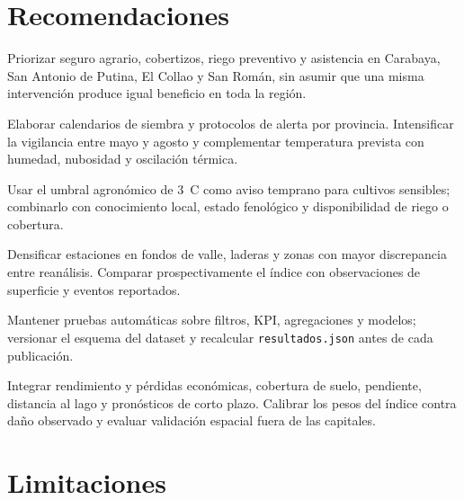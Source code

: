 \documentclass[11pt,a4paper]{article}
\begin{document}
\section{Recomendaciones}

\begin{description}[leftmargin=4.0cm,style=nextline,itemsep=0.65em]
  \item[Gobierno Regional de Puno.] Priorizar seguro agrario, cobertizos, riego preventivo
        y asistencia en Carabaya, San Antonio de Putina, El Collao y San Román, sin asumir
        que una misma intervención produce igual beneficio en toda la región.
  \item[Dirección Regional Agraria.] Elaborar calendarios de siembra y protocolos de
        alerta por provincia. Intensificar la vigilancia entre mayo y agosto y complementar
        temperatura prevista con humedad, nubosidad y oscilación térmica.
  \item[Productores y organizaciones.] Usar el umbral agronómico de 3~\textdegree C como
        aviso temprano para cultivos sensibles; combinarlo con conocimiento local, estado
        fenológico y disponibilidad de riego o cobertura.
  \item[SENAMHI y academia.] Densificar estaciones en fondos de valle, laderas y zonas con
        mayor discrepancia entre reanálisis. Comparar prospectivamente el índice con
        observaciones de superficie y eventos reportados.
  \item[Equipo de desarrollo.] Mantener pruebas automáticas sobre filtros, KPI, agregaciones
        y modelos; versionar el esquema del dataset y recalcular \texttt{resultados.json}
        antes de cada publicación.
  \item[Investigación futura.] Integrar rendimiento y pérdidas económicas, cobertura de
        suelo, pendiente, distancia al lago y pronósticos de corto plazo. Calibrar los pesos
        del índice contra daño observado y evaluar validación espacial fuera de las capitales.
\end{description}

\section{Limitaciones}
\end{document}
